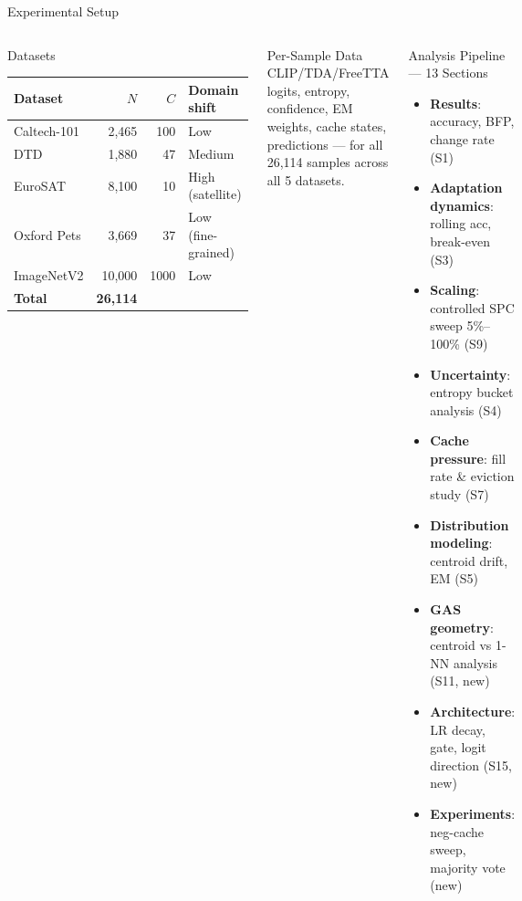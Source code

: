 \documentclass[aspectratio=169,11pt]{beamer}
\begin{document}
\begin{frame}{Experimental Setup}
\begin{columns}[T]
  \begin{block}{Datasets}
    \scriptsize
    \begin{tabular}{lrrl}
      \toprule
      Dataset & $N$ & $C$ & Domain shift\\
      \midrule
      Caltech-101  & 2,465  & 100  & Low\\
      DTD          & 1,880  &  47  & Medium\\
      EuroSAT      & 8,100  &  10  & High (satellite)\\
      Oxford Pets  & 3,669  &  37  & Low (fine-grained)\\
      ImageNetV2   & 10,000 & 1000 & Low\\
      \midrule
      \textbf{Total} & \textbf{26,114} & & \\
      \bottomrule
    \end{tabular}
  \end{block}
  \vspace{3pt}
  \begin{block}{\footnotesize Per-Sample Data}
    \scriptsize
    CLIP/TDA/FreeTTA logits, entropy, confidence, EM weights, cache states, predictions — for all 26,114 samples across all 5 datasets.
  \end{block}
  \begin{exampleblock}{Analysis Pipeline — 13 Sections}
    \begin{itemize}\scriptsize\setlength{\itemsep}{1pt}
      \item[\faChartBar] \textbf{Results}: accuracy, BFP, change rate (S1)
      \item[\faChartLine] \textbf{Adaptation dynamics}: rolling acc, break-even (S3)
      \item[\faSearch] \textbf{Scaling}: controlled SPC sweep 5\%--100\% (S9)
      \item[\faQuestion] \textbf{Uncertainty}: entropy bucket analysis (S4)
      \item[\faDatabase] \textbf{Cache pressure}: fill rate \& eviction study (S7)
      \item[\faProjectDiagram] \textbf{Distribution modeling}: centroid drift, EM (S5)
      \item[\faRuler] \textbf{GAS geometry}: centroid vs 1-NN analysis (S11, new)
      \item[\faCog] \textbf{Architecture}: LR decay, gate, logit direction (S15, new)
      \item[\faFlask] \textbf{Experiments}: neg-cache sweep, majority vote (new)
    \end{itemize}
  \end{exampleblock}
\end{columns}
\end{frame}
\end{document}

